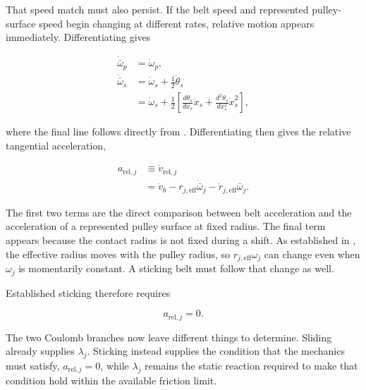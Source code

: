 \documentclass[11pt]{report}
\numberwithin{equation}{section}
\begin{document}
That speed match must also persist. If the belt speed and represented
pulley-surface speed begin changing at different rates, relative motion appears
immediately. Differentiating
 gives

\begin{equation}
\begin{aligned}
    \dot{\bar\omega}_p
    &=
    \dot\omega_p,
    \\
    \dot{\bar\omega}_s
    &=
    \dot\omega_s+\frac{1}{2}\ddot\theta_s
    \\
    &=
    \dot\omega_s
    +
    \frac{1}{2}
    \left[
        \frac{d\theta_s}{dx_s}\ddot x_s
        +
        \frac{d^2\theta_s}{dx_s^2}\dot x_s^2
    \right],
\end{aligned}
\label{eq:representative_contact_angular_acceleration}
\end{equation}

where the final line follows directly from
. Differentiating
 then gives the relative tangential
acceleration,

\begin{equation}
\begin{aligned}
    a_{\mathrm{rel},j}
    &\equiv
    \dot v_{\mathrm{rel},j}
    \\
    &=
    \dot v_b
    -
    r_{j,\mathrm{eff}}\dot{\bar\omega}_j
    -
    \dot r_{j,\mathrm{eff}}\bar\omega_j .
\end{aligned}
\label{eq:tangential_relative_acceleration}
\end{equation}

The first two terms are the direct comparison between belt acceleration and
the acceleration of a represented pulley surface at fixed radius. The final term appears
because the contact radius is not fixed during a shift. As established in
, the effective radius moves with
the pulley radius, so \(r_{j,\mathrm{eff}}\omega_j\) can change even when
\(\omega_j\) is momentarily constant. A sticking belt must follow that change
as well.

Established sticking therefore requires

\begin{equation}
    a_{\mathrm{rel},j}=0.
\label{eq:sticking_acceleration_compatibility}
\end{equation}

The two Coulomb branches now leave different things to determine. Sliding
already supplies \(\lambda_j\). Sticking instead supplies the condition that
the mechanics must satisfy, \(a_{\mathrm{rel},j}=0\), while \(\lambda_j\)
remains the static reaction required to make that condition hold within the
available friction limit.
\end{document}
